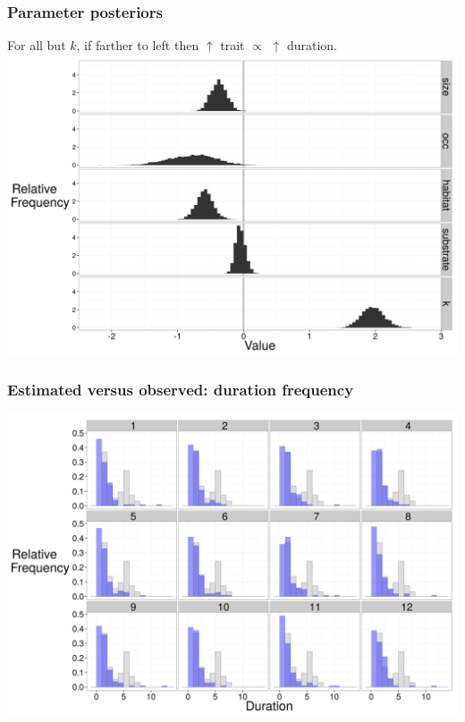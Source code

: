 \documentclass{beamer}
\begin{document}
\begin{frame}
  \frametitle{Parameter posteriors}
  \begin{center}
    For all but \(k\), if farther to \alert{left} then \(\uparrow\) trait \(\propto\) \(\uparrow\) duration.
    \includegraphics[height = 0.7\textheight, width = \textwidth, keepaspectratio = true]{figure/wei_post}
  \end{center}
\end{frame}

\begin{frame}
  \frametitle{Estimated versus observed: duration frequency}
  \begin{center}
    \includegraphics[height = 0.8\textheight, width = \textwidth, keepaspectratio = true]{figure/wei_dur_post}
  \end{center}
\end{frame}
\end{document}

